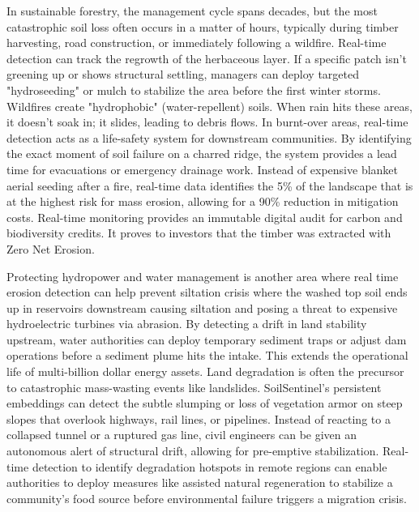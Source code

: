 \documentclass[11pt,letterpaper]{article}
\theoremstyle{plain}
\theoremstyle{definition}
\theoremstyle{remark}
\begin{document}
In sustainable forestry, the management cycle spans decades, but the most catastrophic soil loss often occurs in a matter of hours, typically during timber harvesting, road construction, or immediately following a wildfire. Real-time detection can track the regrowth of the herbaceous layer. If a specific patch isn't greening up or shows structural settling, managers can deploy targeted "hydroseeding" or mulch to stabilize the area before the first winter storms. Wildfires create "hydrophobic" (water-repellent) soils. When rain hits these areas, it doesn't soak in; it slides, leading to debris flows. In burnt-over areas, real-time detection acts as a life-safety system for downstream communities. By identifying the exact moment of soil failure on a charred ridge, the system provides a lead time for evacuations or emergency drainage work. Instead of expensive blanket aerial seeding after a fire, real-time data identifies the 5\% of the landscape that is at the highest risk for mass erosion, allowing for a 90\% reduction in mitigation costs. Real-time monitoring provides an immutable digital audit for carbon and biodiversity credits. It proves to investors that the timber was extracted with Zero Net Erosion.

Protecting hydropower and water management is another area where real time erosion detection can help prevent siltation crisis where the washed top soil ends up in reservoirs downstream causing siltation and posing a threat to expensive hydroelectric turbines via abrasion. By detecting a drift in land stability upstream, water authorities can deploy temporary sediment traps or adjust dam operations before a sediment plume hits the intake. This extends the operational life of multi-billion dollar energy assets. Land degradation is often the precursor to catastrophic mass-wasting events like landslides. SoilSentinel’s persistent embeddings can detect the subtle slumping or loss of vegetation armor on steep slopes that overlook highways, rail lines, or pipelines. Instead of reacting to a collapsed tunnel or a ruptured gas line, civil engineers can be given an autonomous alert of structural drift, allowing for pre-emptive stabilization. Real-time detection to identify degradation hotspots in remote regions can enable authorities to deploy measures like assisted natural regeneration to stabilize a community's food source before environmental failure triggers a migration crisis.
\end{document}
